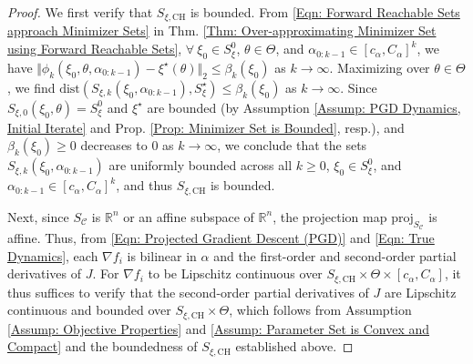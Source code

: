 \documentclass[letterpaper, 10 pt, conference]{ieeeconf}
\newcommand{\ra}{\rightarrow}
\newcommand{\R}{\mathbb{R}}
\newcommand{\?}{\stackrel{?}{=}}
\newcommand{\obj}{J}
\newcommand{\param}{\theta}
\newcommand{\paramSet}{\Theta}
\newcommand{\var}{\xi}
\newcommand{\varMap}{\phi}
\newcommand{\varOpt}{\var^\star}
\newcommand{\varDim}{n}
\newcommand{\varOptSet}{S_\var^\star}
\newcommand{\convergenceRadius}{\beta}
\newcommand{\ratePGD}{\alpha}
\newcommand{\ratePGDMin}{c_\ratePGD}
\newcommand{\ratePGDMax}{C_\ratePGD}
\newcommand{\proj}{\text{proj}}
\newcommand{\constraintSet}{{S_{\mathcal{C}}}}
\newcommand{\state}{\zeta}
\newcommand{\dynamicsFullState}{f}
\newcommand{\varInitialSet}{S_\var^0}
\newcommand{\derivativeFull}{D}
\newcommand{\varForwardReachableSet}[1]{S_{\var, {#1}}}
\newcommand{\varConvexHull}{S_{\var, \text{CH}}}
\newcommand{\dist}{\text{dist}}
\begin{document}
\begin{proof}
We first verify that $\varConvexHull$ is bounded.
From \eqref{Eqn: Forward Reachable Sets approach Minimizer Sets} in Thm. \ref{Thm: Over-approximating Minimizer Set using Forward Reachable Sets},
$\forall \ \var_0 \in \varInitialSet$, $\param \in \paramSet$, and $\ratePGD_{0:k-1} \in [\ratePGDMin, \ratePGDMax]^k$, we have 
$\Vert \varMap_k(\var_0, \param, \ratePGD_{0:k-1}) - \varOpt(\param) \Vert_2 \leq \convergenceRadius_k(\var_0)$ as $k \ra \infty$. Maximizing
over $\param \in \paramSet$, we find $\dist(\varForwardReachableSet{k}(\var_0, \ratePGD_{0:k-1}), \varOptSet) \leq \convergenceRadius_k(\var_0)$ as $k \ra \infty$.
Since $\varForwardReachableSet{0}(\var_0, \param) = \varInitialSet$ and $\varOpt$ are bounded (by Assumption \ref{Assump: PGD Dynamics, Initial Iterate} and Prop. \ref{Prop: Minimizer Set is Bounded}, resp.), and $\convergenceRadius_k(\var_0) \geq 0$ decreases 
to 0 as $k \ra \infty$, we conclude that the sets $\varForwardReachableSet{k}(\var_0, \ratePGD_{0:k-1})$ are uniformly bounded across all $k \geq 0$, $\var_0 \in \varInitialSet$, and $\ratePGD_{0:k-1} \in [\ratePGDMin, \ratePGDMax]^k$, and thus $\varConvexHull$ is bounded.

Next, since $\constraintSet$ is $\R^\varDim$ or an affine subspace of $\R^\varDim$, the projection map $\proj_\constraintSet$ is affine. 
Thus, from \eqref{Eqn: Projected Gradient Descent (PGD)} and \eqref{Eqn: True Dynamics}, 
each $\nabla \dynamicsFullState_i$
is bilinear in $\ratePGD$ and the first-order and second-order partial derivatives of $\obj$.
For $\nabla \dynamicsFullState_i$ 
to be Lipschitz continuous over $\varConvexHull \times \paramSet \times [\ratePGDMin, \ratePGDMax]$, it thus suffices to verify that the second-order partial derivatives of $\obj$ are Lipschitz continuous and bounded over $\varConvexHull \times \paramSet$, which follows from Assumption \ref{Assump: Objective Properties} and \ref{Assump: Parameter Set is Convex and Compact} and the boundedness of $\varConvexHull$ established above.
\end{proof}
\end{document}
